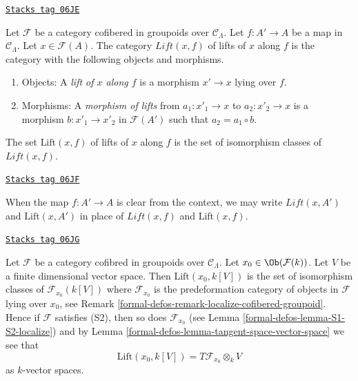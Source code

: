 \begin{definition}[Lifts]
\label{formal-defos-definition-lifts}
\href{https://stacks.math.columbia.edu/tag/06JE}{\texttt{Stacks tag 06JE}}

Let $\mathcal{F}$ be a category cofibered in groupoids over
$\mathcal{C}_\Lambda$. Let $f: A' \to A$ be a map in $\mathcal{C}_\Lambda$.
Let $x \in \mathcal{F}(A)$. The category $\textit{Lift}(x, f)$ of lifts of $x$
along $f$ is the category with the following objects and
morphisms.
\begin{enumerate}
\item Objects: A {\it lift of $x$ along $f$} is a morphism $x' \to x$
lying over $f$.
\item Morphisms: A {\it morphism of lifts} from $a_1 : x'_1 \to x$ to
$a_2 : x'_2 \to x$ is a morphism $b : x'_1 \to x'_2$ in
$\mathcal{F}(A')$ such that $a_2 = a_1 \circ b$.
\end{enumerate}
The set $\text{Lift}(x, f)$ of lifts of $x$ along $f$ is the set of
isomorphism classes of $\textit{Lift}(x, f)$.
\end{definition}

\begin{remark}
\label{formal-defos-remark-omit-arrow}
\href{https://stacks.math.columbia.edu/tag/06JF}{\texttt{Stacks tag 06JF}}

When the map $f: A' \to A$ is clear from the context, we may write
$\textit{Lift}(x, A')$ and $\text{Lift}(x, A')$ in place of
$\textit{Lift}(x, f)$ and $\text{Lift}(x, f)$.
\end{remark}

\begin{remark}
\label{formal-defos-remark-tangent-space-lifting}
\href{https://stacks.math.columbia.edu/tag/06JG}{\texttt{Stacks tag 06JG}}

Let $\mathcal{F}$ be a category cofibred in groupoids over
$\mathcal{C}_\Lambda$. Let $x_0 \in \Ob(\mathcal{F}(k))$.
Let $V$ be a finite dimensional vector space.
Then $\text{Lift}(x_0, k[V])$ is the set of isomorphism classes
of $\mathcal{F}_{x_0}(k[V])$ where $\mathcal{F}_{x_0}$ is the
predeformation category of objects in $\mathcal{F}$ lying over
$x_0$, see
Remark \ref{formal-defos-remark-localize-cofibered-groupoid}.
Hence if $\mathcal{F}$ satisfies (S2), then so does
$\mathcal{F}_{x_0}$ (see
Lemma \ref{formal-defos-lemma-S1-S2-localize})
and by
Lemma \ref{formal-defos-lemma-tangent-space-vector-space}
we see that
$$
\text{Lift}(x_0, k[V]) = T\mathcal{F}_{x_0} \otimes_k V
$$
as $k$-vector spaces.
\end{remark}


